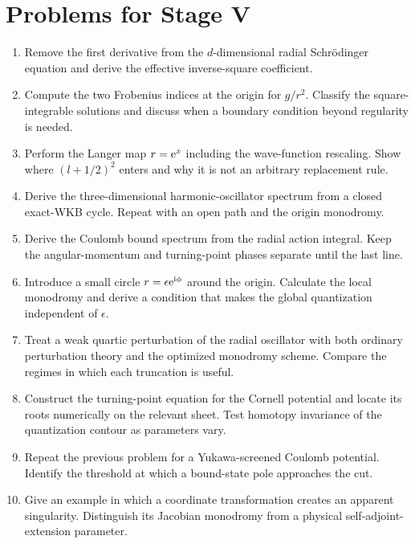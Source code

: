 \section{Problems for Stage V}
\label{problems:stage-V}

\begin{enumerate}[label=\textbf{V.\arabic*},leftmargin=*]
  \item Remove the first derivative from the $d$-dimensional radial
  Schr\"odinger equation and derive the effective inverse-square coefficient.

  \item Compute the two Frobenius indices at the origin for
  $g/r^2$.  Classify the square-integrable solutions and discuss when a
  boundary condition beyond regularity is needed.

  \item Perform the Langer map $r=\mathrm{e}^x$ including the wave-function
  rescaling.  Show where $(l+1/2)^2$ enters and why it is not an arbitrary
  replacement rule.

  \item Derive the three-dimensional harmonic-oscillator spectrum from a
  closed exact-WKB cycle.  Repeat with an open path and the origin monodromy.

  \item Derive the Coulomb bound spectrum from the radial action integral.
  Keep the angular-momentum and turning-point phases separate until the last
  line.

  \item Introduce a small circle $r=\epsilon\mathrm{e}^{\mathrm{i}\phi}$ around the
  origin.  Calculate the local monodromy and derive a condition that makes the
  global quantization independent of $\epsilon$.

  \item Treat a weak quartic perturbation of the radial oscillator with both
  ordinary perturbation theory and the optimized monodromy scheme.  Compare
  the regimes in which each truncation is useful.

  \item Construct the turning-point equation for the Cornell potential and
  locate its roots numerically on the relevant sheet.  Test homotopy
  invariance of the quantization contour as parameters vary.

  \item Repeat the previous problem for a Yukawa-screened Coulomb potential.
  Identify the threshold at which a bound-state pole approaches the cut.

  \item Give an example in which a coordinate transformation creates an
  apparent singularity.  Distinguish its Jacobian monodromy from a physical
  self-adjoint-extension parameter.
\end{enumerate}
